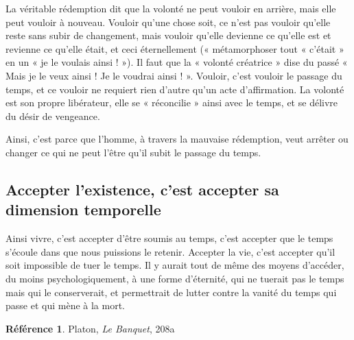 \documentclass[french]{book}
\theoremstyle{definition}
\newtheorem*{refe}{Référence}
\begin{document}
La véritable rédemption dit que la volonté ne peut vouloir en arrière, mais elle peut vouloir à nouveau. Vouloir qu’une chose soit, ce n’est pas vouloir qu’elle reste sans subir de changement, mais vouloir qu’elle devienne ce qu’elle est et revienne ce qu’elle était, et ceci éternellement (« métamorphoser tout « c’était » en un « je le voulais ainsi ! »). Il faut que la « volonté créatrice » dise du passé « Mais je le veux ainsi ! Je le voudrai ainsi ! ». Vouloir, c’est vouloir le passage du temps, et ce vouloir ne requiert rien d’autre qu’un acte d’affirmation. La volonté est son propre libérateur, elle se « réconcilie » ainsi avec le temps, et se délivre du désir de vengeance.

Ainsi, c’est parce que l’homme, à travers la mauvaise rédemption, veut arrêter ou changer ce qui ne peut l’être qu’il subit le passage du temps.

\subsection{Accepter l’existence, c’est accepter sa dimension temporelle}

Ainsi vivre, c’est accepter d’être soumis au temps, c’est accepter que le temps s’écoule dans que nous puissions le retenir. Accepter la vie, c’est accepter qu’il soit impossible de tuer le temps.
Il y aurait tout de même des moyens d’accéder, du moins psychologiquement, à une forme d’éternité, qui ne tuerait pas le temps mais qui le conserverait, et permettrait de lutter contre la vanité du temps qui passe et qui mène à la mort.

\begin{refe}
	Platon, \textit{Le Banquet}, 208a
\end{refe}
\end{document}
